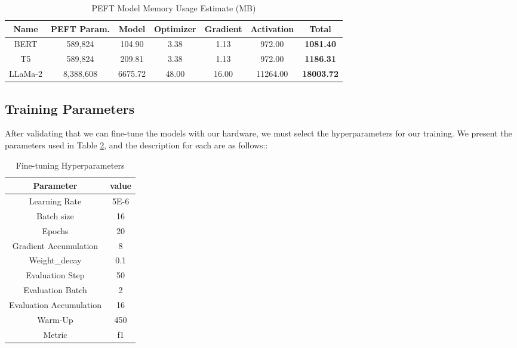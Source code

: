 \begin{table}[H]
	\centering
	\caption{PEFT Model Memory Usage Estimate (MB)}
	\begin{tabular}{||c | c | c | c | c | c | c||} 
		\hline
		\textbf{Name} & \textbf{PEFT Param.} & \textbf{Model} & \textbf{Optimizer} & \textbf{Gradient} & \textbf{Activation} & \textbf{Total} \\ [1ex] 
		\hline
		BERT & 589,824 & 104.90 & 3.38 & 1.13 & 972.00 & \textbf{1081.40} \\ [1ex]
		\hline
		T5 & 589,824 & 209.81 & 3.38 & 1.13 & 972.00 & \textbf{1186.31}  \\[1ex]
		\hline
		LLaMa-2 & 8,388,608 & 6675.72 & 48.00 & 16.00 & 11264.00 & \textbf{18003.72}  \\[1ex]
		\hline
	\end{tabular}
	\label{table:PeftMemoryUsage}
\end{table}


\subsection{Training Parameters}
After validating that we can fine-tune the models with our hardware, we must select the hyperparameters for our training. We present the parameters used in Table \ref{table:hyperparameters}, and the description for each are as follows::

\begin{table}[!ht]
	\centering
	\caption{Fine-tuning Hyperparameters}
	\begin{tabular}{||c | c||} 
		\hline
		\textbf{Parameter} & \textbf{value} \\ [1.5ex] 
		\hline
		Learning Rate & 5E-6  \\ [1ex]
		\hline
		Batch size & 16  \\[1ex]
		\hline
		Epochs & 20 \\[1ex]
		\hline
		Gradient Accumulation & 8 \\[1ex]
		\hline
		Weight\_decay & 0.1 \\[1ex]
		\hline
		Evaluation Step & 50 \\[1ex]
		\hline
		Evaluation Batch & 2 \\[1ex]
		\hline
		Evaluation Accumulation & 16 \\[1ex]
		\hline
		Warm-Up & 450 \\[1ex]
		\hline
		Metric & f1 \\[1ex]
		\hline
	\end{tabular}
	\label{table:hyperparameters}
\end{table}


